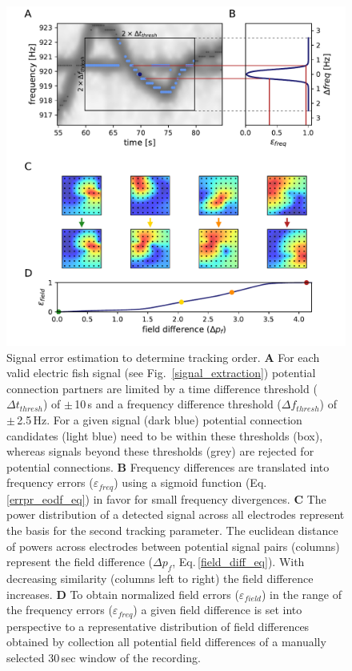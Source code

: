 \documentclass[11pt,pdftex]{article}
\newcommand{\figitem}[1]{\textsf{\bfseries\uppercase{#1}}\penalty10000 }
\newcommand{\fref}[1]{\textup{\ref{#1}}}
\newcommand{\fig}{Fig.}
\newcommand{\figref}[1]{\fig~\fref{#1}}
\newcommand{\eqnref}[1]{Eq.\,\ref{#1}}
\begin{document}
\begin{figure}[h!]
  \centerline{\includegraphics[width=.9\linewidth]{tracking_features}}
  \caption{\label{features} Signal error estimation to determine tracking order. \figitem{A} For each valid electric fish signal (see \figref{signal_extraction}) potential connection partners are limited by a time difference threshold ($\Delta t_{thresh}$) of $\pm$\,10\,s and a frequency difference threshold ($\Delta f_{thresh}$) of $\pm$\,2.5\,Hz. For a given signal (dark blue) potential connection candidates (light blue) need to be within these thresholds (box), whereas signals beyond these thresholds (grey) are rejected for potential connections. \figitem{B} Frequency differences are translated into frequency errors ($\varepsilon_{freq}$) using a sigmoid function (\eqnref{errpr_eodf_eq}) in favor for small frequency divergences. \figitem{C} The power distribution of a detected signal across all electrodes represent the basis for the second tracking parameter. The euclidean distance of powers across electrodes between potential signal pairs (columns) represent the field difference ($\Delta p_{f}$, \eqnref{field_diff_eq}). With decreasing similarity (columns left to right) the field difference increases. \figitem{D} To obtain normalized field errors ($\varepsilon_{field}$) in the range of the frequency errors ($\varepsilon_{freq}$) a given field difference is set into perspective to a representative distribution of field differences obtained by collection all potential field differences of a manually selected 30\,sec window of the recording. }
\end{figure}
\end{document}
